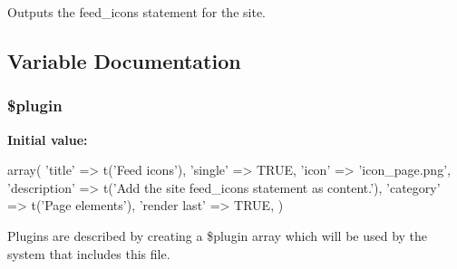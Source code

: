 Outputs the feed\_\-icons statement for the site. 

\subsection{Variable Documentation}
\hypertarget{page__feed__icons_8inc_ada8a7130088351710bb02ed622d6bf65}{
\subsubsection[{\$plugin}]{\setlength{\rightskip}{0pt plus 5cm}\$plugin}}
\label{page__feed__icons_8inc_ada8a7130088351710bb02ed622d6bf65}
{\bfseries Initial value:}
\begin{DoxyCode}
 array(
  'title' => t('Feed icons'),
  'single' => TRUE,
  'icon' => 'icon_page.png',
  'description' => t('Add the site feed_icons statement as content.'),
  'category' => t('Page elements'),
  'render last' => TRUE,
)
\end{DoxyCode}
Plugins are described by creating a \$plugin array which will be used by the system that includes this file. 